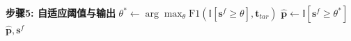 \documentclass[UTF8]{ctexart}
\begin{document}
\begin{algorithm}[t]
\begin{algorithmic}[1]
			\Statex \textbf{步骤5: 自适应阈值与输出}
			\State $\theta^* \gets \arg\max_{\theta} \text{F1}(\mathbb{I}[\mathbf{s}^f \geq \theta], \mathbf{t}_{tar})$ 
			\State $\hat{\mathbf{p}} \gets \mathbb{I}[\mathbf{s}^f \geq \theta^*]$ 
			\State \Return $\hat{\mathbf{p}}, \mathbf{s}^f$ 
		\end{algorithmic}
	\end{algorithm}
	
\end{document}
